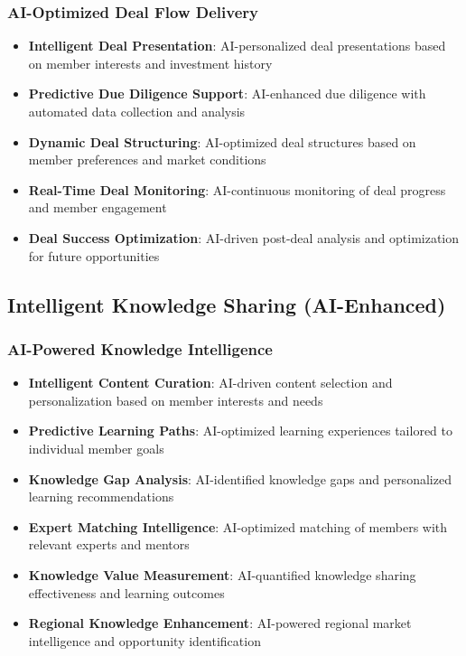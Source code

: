 \subsubsection{AI-Optimized Deal Flow Delivery}

\begin{itemize}
    \item \textbf{Intelligent Deal Presentation}: AI-personalized deal presentations based on member interests and investment history
    \item \textbf{Predictive Due Diligence Support}: AI-enhanced due diligence with automated data collection and analysis
    \item \textbf{Dynamic Deal Structuring}: AI-optimized deal structures based on member preferences and market conditions
    \item \textbf{Real-Time Deal Monitoring}: AI-continuous monitoring of deal progress and member engagement
    \item \textbf{Deal Success Optimization}: AI-driven post-deal analysis and optimization for future opportunities
\end{itemize}

\subsection{Intelligent Knowledge Sharing (AI-Enhanced)}

\subsubsection{AI-Powered Knowledge Intelligence}

\begin{itemize}
    \item \textbf{Intelligent Content Curation}: AI-driven content selection and personalization based on member interests and needs
    \item \textbf{Predictive Learning Paths}: AI-optimized learning experiences tailored to individual member goals
    \item \textbf{Knowledge Gap Analysis}: AI-identified knowledge gaps and personalized learning recommendations
    \item \textbf{Expert Matching Intelligence}: AI-optimized matching of members with relevant experts and mentors
    \item \textbf{Knowledge Value Measurement}: AI-quantified knowledge sharing effectiveness and learning outcomes
    \item \textbf{Regional Knowledge Enhancement}: AI-powered regional market intelligence and opportunity identification
\end{itemize}

